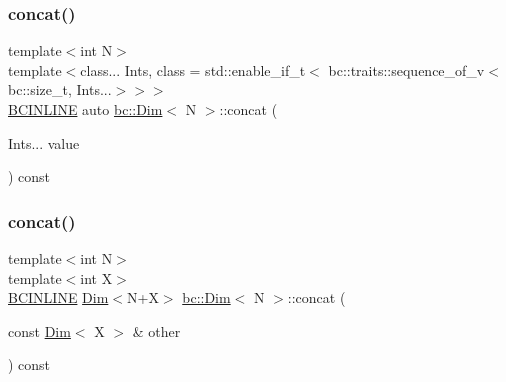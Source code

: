 \mbox{\label{structbc_1_1Dim_a6e620bc0bff98d7a0ef71492dc7ef86a}} 
\subsubsection{\texorpdfstring{concat()}{concat()}\hspace{0.1cm}{\footnotesize\ttfamily [1/2]}}
{\footnotesize\ttfamily template$<$int N$>$ \\
template$<$class... Ints, class  = std\+::enable\+\_\+if\+\_\+t$<$				bc\+::traits\+::sequence\+\_\+of\+\_\+v$<$bc\+::size\+\_\+t, Ints...$>$$>$$>$ \\
\hyperlink{common_8h_a6699e8b0449da5c0fafb878e59c1d4b1}{B\+C\+I\+N\+L\+I\+NE} auto \hyperlink{structbc_1_1Dim}{bc\+::\+Dim}$<$ N $>$\+::concat (\begin{DoxyParamCaption}\item[{Ints...}]{value }\end{DoxyParamCaption}) const\hspace{0.3cm}{\ttfamily [inline]}}

\mbox{\label{structbc_1_1Dim_af323953baa9138b64b4e703b1366f31a}} 
\subsubsection{\texorpdfstring{concat()}{concat()}\hspace{0.1cm}{\footnotesize\ttfamily [2/2]}}
{\footnotesize\ttfamily template$<$int N$>$ \\
template$<$int X$>$ \\
\hyperlink{common_8h_a6699e8b0449da5c0fafb878e59c1d4b1}{B\+C\+I\+N\+L\+I\+NE} \hyperlink{structbc_1_1Dim}{Dim}$<$N+X$>$ \hyperlink{structbc_1_1Dim}{bc\+::\+Dim}$<$ N $>$\+::concat (\begin{DoxyParamCaption}\item[{const \hyperlink{structbc_1_1Dim}{Dim}$<$ X $>$ \&}]{other }\end{DoxyParamCaption}) const\hspace{0.3cm}{\ttfamily [inline]}}

\mbox{\label{structbc_1_1Dim_ad0ddd6e6602ada9f8a5060cc0962b7dc}} 
